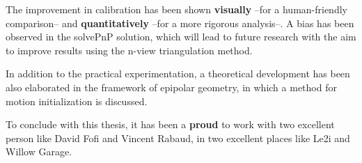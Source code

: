 The improvement in calibration has been shown \textbf{visually} --for a human-friendly comparison-- and \textbf{quantitatively} --for a more rigorous analysis--. A bias has been observed in the solvePnP solution, which will lead to future research with the aim to improve results using the n-view triangulation method. %

In addition to the practical experimentation, a theoretical development has been also elaborated in the framework of epipolar geometry, in which a method for motion initialization is discussed.


To conclude with this thesis, it has been a \textbf{proud} to work with two excellent person like David Fofi and Vincent Rabaud, in two excellent places like Le2i and Willow Garage.
